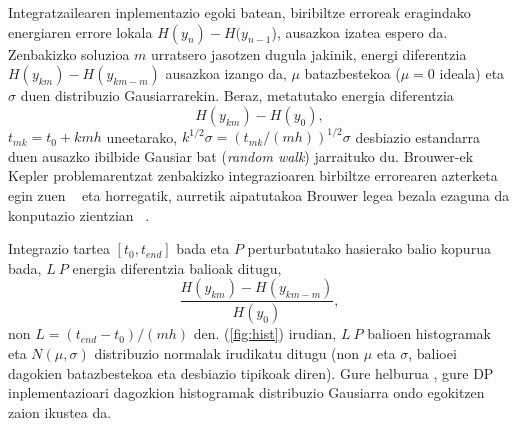 Integratzailearen inplementazio egoki batean, biribiltze erroreak eragindako energiaren errore lokala $H(y_n)-H(y_{n-1}$), ausazkoa izatea espero da. Zenbakizko soluzioa $m$ urratsero jasotzen dugula jakinik, energi diferentzia $H(y_{km})-H(y_{km-m})$ ausazkoa izango da, $\mu$ batazbestekoa ($\mu=0$ ideala) eta $\sigma$ duen distribuzio Gausiarrarekin. Beraz, metatutako energia diferentzia
\begin{equation*}
H(y_{km})-H(y_0),
\end{equation*} 
$t_{mk}=t_0+kmh$ uneetarako, $k^{1/2} \sigma=(t_{mk}/(mh))^{1/2} \sigma$ desbiazio estandarra duen ausazko ibilbide Gausiar bat (\emph{random walk}) jarraituko du. Brouwer-ek Kepler problemarentzat zenbakizko integrazioaren birbiltze errorearen azterketa egin zuen ~\cite{Brouwer1937} eta horregatik, aurretik aipatutakoa Brouwer legea bezala ezaguna da konputazio zientzian ~\cite{Grazier2005}.

Integrazio tartea $[t_0, t_{end}]$ bada eta $P$ perturbatutako hasierako balio kopurua bada, $L \ P$ energia diferentzia balioak ditugu,
\begin{equation*}
\frac{H(y_{km})-H(y_{km-m})}{H(y_0)},
\end{equation*} 
non $L=(t_{end}-t_0)/(mh)$ den. (\ref{fig:hist}) irudian, $L \ P$ balioen histogramak eta $N(\mu,\sigma)$ distribuzio normalak irudikatu ditugu (non $\mu$ eta $\sigma$, balioei dagokien batazbestekoa eta desbiazio tipikoak diren). Gure helburua , gure DP inplementazioari dagozkion histogramak distribuzio Gausiarra ondo egokitzen zaion ikustea da.    

